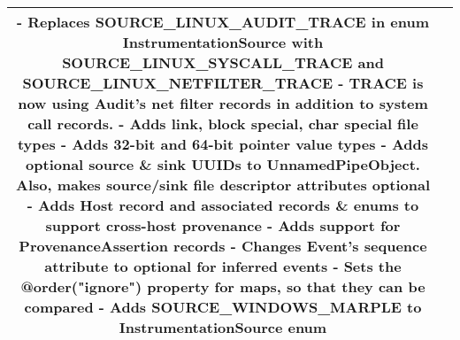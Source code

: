\documentclass[10pt, conference, onecolumn]{IEEEtran}
\newcommand\tab[1][1em]{\hspace*{#1}}
\begin{document}
\begin{longtable}{|c|p{17cm}|}
  - Replaces SOURCE\_LINUX\_AUDIT\_TRACE in enum InstrumentationSource with SOURCE\_LINUX\_SYSCALL\_TRACE and \newline
  \tab SOURCE\_LINUX\_NETFILTER\_TRACE \newline
  \tab - TRACE is now using Audit's net filter records in addition to system call records. \newline
  - Adds link, block special, char special file types \newline
  - Adds 32-bit and 64-bit pointer value types \newline
  - Adds optional source \& sink UUIDs to UnnamedPipeObject. Also, makes source/sink file descriptor attributes optional \newline
  - Adds Host record and associated records \& enums to support cross-host provenance \newline
  - Adds support for ProvenanceAssertion records \newline
  - Changes Event's sequence attribute to optional for inferred events \newline
  - Sets the @order("ignore") property for maps, so that they can be compared \newline
  - Adds SOURCE\_WINDOWS\_MARPLE to InstrumentationSource enum \newline
\\\hline
\end{longtable}
\end{document}
